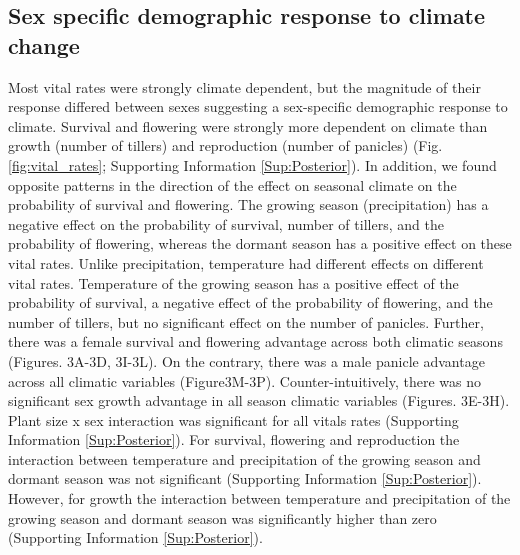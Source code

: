 \documentclass[12pt]{article}
\begin{document}
\subsection*{Sex specific demographic response to climate change}
Most vital rates were strongly climate dependent, but the magnitude of their response differed between sexes suggesting a sex-specific demographic response to climate. 
Survival and flowering were strongly more dependent on climate than growth (number of tillers) and reproduction (number of panicles) (Fig.\ref{fig:vital_rates}; Supporting Information \ref{Sup:Posterior}).
In addition, we found opposite patterns in the direction of the effect on seasonal climate on the probability of survival and flowering.
The growing season (precipitation) has a negative effect on the probability of survival, number of tillers, and the probability of flowering, whereas the dormant season has a positive effect on these vital rates. 
Unlike precipitation, temperature had different effects on different vital rates.
Temperature of the growing season has a positive effect of the probability of survival, a negative effect of the probability of flowering, and the number of tillers, but no significant effect on the number of panicles. 
Further, there was a female survival and flowering advantage across both climatic seasons (Figures. 3A-3D, 3I-3L). 
On the contrary, there was a male panicle advantage across all climatic variables (Figure3M-3P). 
Counter-intuitively, there was no significant sex growth advantage in all season climatic variables (Figures. 3E-3H). 
Plant size x sex interaction was significant for all vitals rates (Supporting Information \ref{Sup:Posterior}).
For survival, flowering and reproduction the interaction between temperature and precipitation of the growing season and dormant season was not significant (Supporting Information \ref{Sup:Posterior}). 
However, for growth the interaction between temperature and precipitation of the growing season and dormant season was significantly higher than zero (Supporting Information \ref{Sup:Posterior}). 
\end{document}
